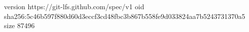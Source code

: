version https://git-lfs.github.com/spec/v1
oid sha256:5c46b597f880d60d3eccf3cd48fbc3b867b558fe9d033824aa7b5243731370a5
size 87496
